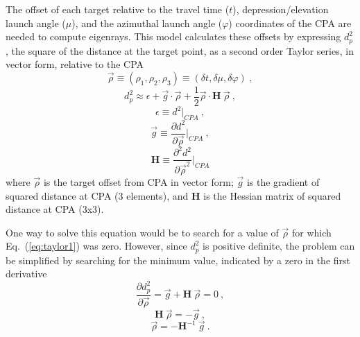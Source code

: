 \documentclass{ws-jca}
\begin{document}
The offset of each target relative to the travel time  (\(t\)),
depression/elevation launch angle (\(\mu\)), and the azimuthal launch
angle (\(\varphi\)) coordinates of the CPA are needed to compute eigenrays.
This model calculates these offsets by expressing \(d^2_{p}\), the square
of the distance at the target point, as a second
order Taylor series, in vector form, relative to the CPA
\begin{equation}
	\vec{\rho} \equiv (\rho_1, \rho_2, \rho_3) 
		\equiv (\delta t, \delta \mu, \delta \varphi) \:,
	\label{eq:rho_defined}
\end{equation}
\begin{equation}
	d^2_{p} \approx \epsilon + \vec{g} \cdot \vec{\rho} 
		+ \frac{1}{2} \vec{\rho} \cdot \mathbf{H} \: \vec{\rho} \:,
	\label{eq:taylor1}
\end{equation}
\begin{equation}
	\epsilon  \equiv d^2 \big|_{CPA} \:,
	\label{eq:taylor2}
\end{equation}
\begin{equation}
	\vec{g} \equiv \frac{\partial d^2}{\partial \vec{\rho} } \big|_{CPA} \:,
	\label{eq:taylor3}
\end{equation}
\begin{equation}
	\mathbf{H} \equiv \frac{\partial^2 d^2}{\partial \vec{\rho}^2 } \big|_{CPA}
	\label{eq:taylor4}
\end{equation}
where 
\(\vec{\rho}\) is the target offset from CPA in vector form;
\(\vec{g}\) is the gradient of squared distance at CPA (3 elements), and
\(\mathbf{H}\) is the Hessian matrix of squared distance at CPA (3x3).

One way to solve this equation would be to search for a value of
\(\vec{\rho}\) for which Eq.~(\ref{eq:taylor1}) was zero. However, since
\(d^2_{p}\) is positive definite, the problem can be simplified by
searching for the minimum value, indicated by a zero in the first
derivative
\begin{equation}
	\frac{\partial d^2_{p}}{\partial \vec{\rho} } 
		= \vec{g} + \mathbf{H} \: \vec{\rho} = 0 \:,
	\label{eq:inverse1}
\end{equation}
\begin{equation}
	\mathbf{H} \: \vec{\rho} = -\vec{g} \:,
	\label{eq:inverse2}
\end{equation}
\begin{equation}
	\vec{\rho} = - \mathbf{H}^{-1} \: \vec{g} \:.
	\label{eq:inverse3}
\end{equation}
\end{document}
